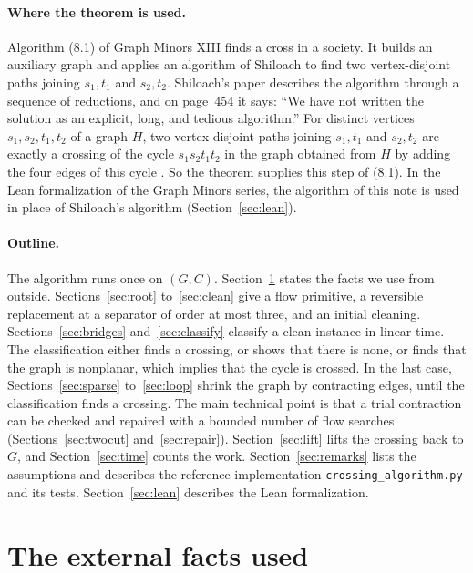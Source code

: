 \documentclass[11pt]{article}
\begin{document}
\paragraph{Where the theorem is used.}
Algorithm (8.1) of Graph Minors XIII \cite[page~93]{GM13} finds a cross in a
society. It builds an auxiliary graph and applies an algorithm of Shiloach
\cite{Sh80} to find two vertex-disjoint paths joining $s_1,t_1$ and $s_2,t_2$.
Shiloach's paper describes the algorithm through a sequence of reductions, and
on page~454 it says: ``We have not written the solution as an explicit, long,
and tedious algorithm.'' For distinct vertices $s_1,s_2,t_1,t_2$ of a graph
$H$, two vertex-disjoint paths joining $s_1,t_1$ and $s_2,t_2$ are exactly a
crossing of the cycle $s_1s_2t_1t_2$ in the graph obtained from $H$ by adding
the four edges of this cycle \cite[Section~1.2, pages~2--3]{HP25}. So the
theorem supplies this step of (8.1). In the Lean formalization of the Graph
Minors series, the algorithm of this note is used in place of Shiloach's
algorithm (Section~\ref{sec:lean}).

\paragraph{Outline.}
The algorithm runs once on $(G,C)$. Section~\ref{sec:facts} states the facts we
use from outside. Sections~\ref{sec:root} to~\ref{sec:clean} give a flow
primitive, a reversible replacement at a separator of order at most three, and
an initial cleaning. Sections~\ref{sec:bridges} and~\ref{sec:classify} classify
a clean instance in linear time. The classification either finds a crossing,
or shows that there is none, or finds that the graph is nonplanar, which
implies that the cycle is crossed. In the last case, Sections~\ref{sec:sparse}
to~\ref{sec:loop} shrink the graph by contracting edges, until the
classification finds a crossing. The main technical point is that a trial
contraction can be checked and repaired with a bounded number of flow searches
(Sections~\ref{sec:twocut} and~\ref{sec:repair}). Section~\ref{sec:lift} lifts
the crossing back to $G$, and Section~\ref{sec:time} counts the work.
Section~\ref{sec:remarks} lists the assumptions and describes the reference
implementation \texttt{crossing\_algorithm.py} and its tests.
Section~\ref{sec:lean} describes the Lean formalization.

\section{The external facts used}\label{sec:facts}
\end{document}
